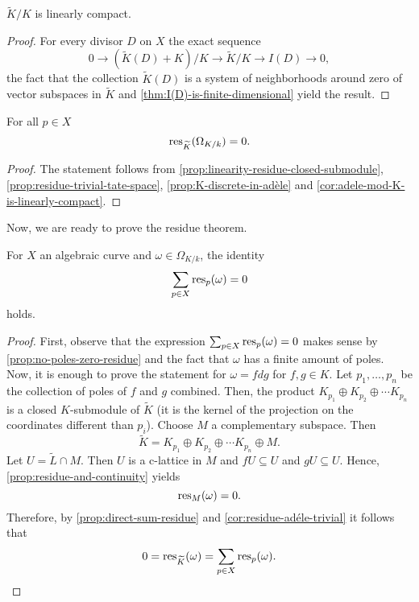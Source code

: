 \begin{corollary}\label{cor:adele-mod-K-is-linearly-compact}
	$\widetilde{K}/K$ is linearly compact.
\end{corollary}
\begin{proof}
	For every divisor $D$ on $X$ the exact sequence
	\[
	0 \to (\widetilde{K}(D) + K)/ K \to \widetilde{K}/K \to I(D) \to 0,
	\]
	the fact that the collection $\widetilde{K}(D)$ is a system of neighborhoods around zero of vector subspaces in $\widetilde{K}$ and \cref{thm:I(D)-is-finite-dimensional} yield the result.
\end{proof}
\begin{corollary}\label{cor:residue-adéle-trivial}
	For all $p\in X$
	\[
		\operatorname{res}_{\widetilde{K}}(\Omega_{K/k}) = 0.
	\]
\end{corollary}
\begin{proof}
	The statement follows from \cref{prop:linearity-residue-closed-submodule}, \cref{prop:residue-trivial-tate-space}, \cref{prop:K-discrete-in-adèle} and \cref{cor:adele-mod-K-is-linearly-compact}.
\end{proof}

Now, we are ready to prove the residue theorem. 
\begin{theorem}\label{thm:residue-theorem}
	For $X$ an algebraic curve and $\omega \in \Omega_{K/k}$, the identity 
	\[
		\sum_{p\in X}\operatorname{res}_{p}(\omega) = 0
	\]
	holds. 
\end{theorem}
\begin{proof}
	First, observe that the expression $\sum_{p\in X}\operatorname{res}_{p}(\omega) = 0$ makes sense by \cref{prop:no-poles-zero-residue} and the fact that $\omega$ has a finite amount of poles. Now, it is enough to prove the statement for $\omega = fdg$ for $f,g \in K$. Let $p_{1}, \ldots, p_{n}$ be the collection of poles of $f$ and $g$ combined. Then, the product $K_{p_{1}} \oplus K_{p_{2}} \oplus \cdots K_{p_{n}}$ is a closed $K$-submodule of $\widetilde{K}$ (it is the kernel of the projection on the coordinates different than $p_{i}$). Choose $M$ a complementary subspace. Then
	\[
		\widetilde{K} = K_{p_{1}} \oplus K_{p_{2}} \oplus \cdots K_{p_{n}} \oplus M. 
	\] 
	Let $U = \widetilde{L} \cap M$. Then $U$ is a c-lattice in $M$ and $fU \subseteq U$ and $gU \subseteq U$. Hence, \cref{prop:residue-and-continuity} yields
	\[
		\operatorname{res}_{M}(\omega) = 0.
	\]
	Therefore, by \cref{prop:direct-sum-residue} and \cref{cor:residue-adéle-trivial} it follows that
	\[
		0 = \operatorname{res}_{\widetilde{K}}(\omega) = \sum_{p\in X}\operatorname{res}_{p}(\omega).
	\]
\end{proof}
